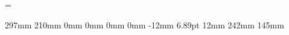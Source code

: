 % 
\emergencystretch=\maxdimen%
%



\makeatletter
\newcommand\bibstyle@semicolon{\bibpunct();a,,}
\makeatother

\makeatletter
\renewcommand*{\@seccntformat}[1]{\csname the#1\endcsname\hspace{1mm}}
\makeatother



\setlength{\paperheight} {297mm}
\setlength{\paperwidth } {210mm}
\setlength{\oddsidemargin} {0mm}
\setlength{\evensidemargin} {0mm}
\setlength{\marginparwidth} {0mm}
\setlength{\marginparsep} {0mm}
\setlength{\topmargin} {-12mm}
\setlength{\headheight} {6.89pt} %
\setlength{\headsep} {12mm}
\setlength{\voffset}{0mm}
\setlength{\hoffset}{14.75mm}
\setlength{\textheight} {242mm} 
\setlength{\textwidth} {145mm} 
\setlength{\footskip}{35pt}  %

\renewcommand{\chapterautorefname}{Chapter}
